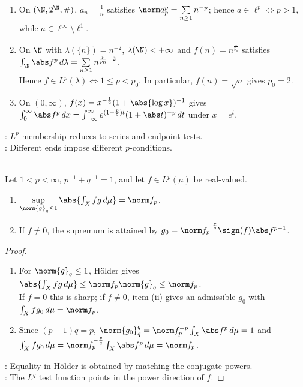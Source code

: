 \begin{example} \label{ex:lp-membership-models-from-exercises} 
\begin{enumerate}[label=(\roman*)]
\setlength{\itemsep}{0pt}
\item On $(\N,2^\N,\#)$, $a_n=\frac{1}{n}$ satisfies $\norm a_p^p=\sum\limits_{n\geq1}n^{-p}$; hence $a\in\ell^p\Longleftrightarrow p>1$, while $a\in\ell^\infty\setminus\ell^1$.
\item On $\N$ with $\lambda(\{n\})=n^{-2}$, $\lambda(\N)<+\infty$ and $f(n)=n^{\frac{1}{p_0}}$ satisfies $\int_\N\abs f^p\,d\lambda=\sum\limits_{n\geq1}n^{\frac{p}{p_0}-2}$.\\
Hence $f\in L^p(\lambda)\Longleftrightarrow1\leq p<p_0$. In particular, $f(n)=\sqrt n$ gives $p_0=2$.
\item On $(0,\infty)$, $f(x)=x^{-\frac{1}{2}}(1+\abs{\log x})^{-1}$ gives $\int_0^\infty\abs f^p\,dx=\int_{-\infty}^{\infty}e^{(1-\frac{p}{2})t}(1+\abs t)^{-p}\,dt$ under $x=e^t$.\\
\end{enumerate}
: $L^p$ membership reduces to series and endpoint tests.\\
: Different ends impose different $p$-conditions.
\end{example}

\begin{proposition} \label{prop:holder-dual-norm-attainment} \\
Let $1<p<\infty$, $p^{-1}+q^{-1}=1$, and let $f\in L^p(\mu)$ be real-valued.
\begin{enumerate}[label=(\roman*)]
\setlength{\itemsep}{0pt}
\item $\sup\limits_{\norm{g}_q\leq1}\abs{\int_Xfg\,d\mu}=\norm f_p$.
\item If $f\neq0$, the supremum is attained by $g_0=\norm f_p^{-\frac{p}{q}}\sign(f)\abs f^{p-1}$.
\end{enumerate}
\begin{proof}
\begin{enumerate}[label=(\roman*)]
\setlength{\itemsep}{0pt}
\item For $\norm{g}_q\leq1$, H\"older gives $\abs{\int_Xfg\,d\mu}\leq\norm f_p\norm{g}_q\leq\norm f_p$.\\
If $f=0$ this is sharp; if $f\neq0$, item (ii) gives an admissible $g_0$ with $\int_Xfg_0\,d\mu=\norm f_p$.
\item Since $(p-1)q=p$, $\norm{g_0}_q^q=\norm f_p^{-p}\int_X\abs f^p\,d\mu=1$ and $\int_Xfg_0\,d\mu=\norm f_p^{-\frac{p}{q}}\int_X\abs f^p\,d\mu=\norm f_p$.
\end{enumerate}
: Equality in H\"older is obtained by matching the conjugate powers.\\
: The $L^q$ test function points in the power direction of $f$.
\end{proof}
\end{proposition}

